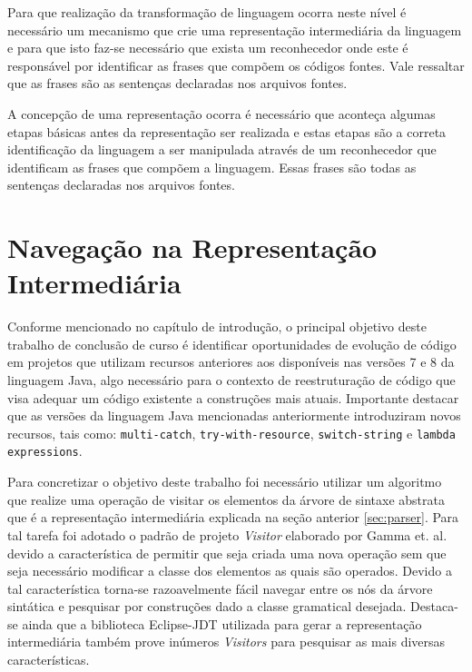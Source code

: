 Para que realização da transformação de linguagem ocorra neste nível é necessário um mecanismo que crie uma representação intermediária da linguagem e para que isto faz-se necessário que exista um reconhecedor onde este é responsável por identificar as frases que compõem os códigos fontes. Vale ressaltar que as frases são as sentenças declaradas nos arquivos fontes.

A concepção de uma representação ocorra é necessário que aconteça algumas etapas básicas antes da representação ser realizada e estas etapas são a correta identificação da linguagem a ser manipulada através de um reconhecedor que identificam as frases que compõem a linguagem. Essas frases são todas as sentenças declaradas nos arquivos fontes.


\section{Navegação na Representação Intermediária}\label{sec:visitor}
Conforme mencionado no capítulo de introdução, o principal objetivo deste trabalho de conclusão de curso é identificar oportunidades de evolução de código  em projetos que utilizam recursos anteriores aos disponíveis nas versões 7 e 8 da linguagem Java, algo necessário para o contexto de reestruturação de código que visa adequar um código existente a construções mais atuais. Importante destacar que as versões da linguagem Java mencionadas anteriormente introduziram novos recursos, tais como: \texttt{multi-catch}, \texttt{try-with-resource}, \texttt{switch-string} e \texttt{lambda expressions}.

Para concretizar o objetivo deste trabalho foi necessário utilizar um algoritmo que realize uma operação de visitar os elementos da árvore de sintaxe abstrata que é a representação intermediária explicada na seção anterior \ref{sec:parser}. Para tal tarefa foi adotado o padrão de projeto \textit{Visitor} elaborado por Gamma et. al.\cite{Gamma:1995} devido a característica de permitir que seja criada uma nova operação sem que seja necessário modificar a classe dos elementos as quais são operados. Devido a tal característica torna-se razoavelmente fácil navegar entre os nós da árvore sintática e pesquisar por construções dado a classe gramatical desejada. Destaca-se ainda que a biblioteca Eclipse-JDT utilizada para gerar a representação intermediária também prove inúmeros \textit{Visitors} para pesquisar as mais diversas características.


